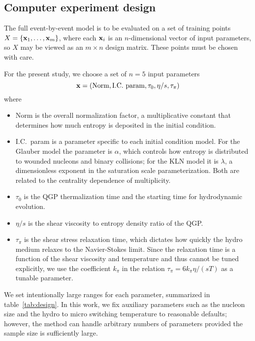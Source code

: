 \documentclass[aps,prc,reprint,superscriptaddress,amsmath]{revtex4-1}
\begin{document}
\subsection{Computer experiment design}

The full event-by-event model is to be evaluated on a set of training points $X = \{\mathbf x_1, \ldots, \mathbf x_m\}$, where each $\mathbf x_i$ is an $n$-dimensional vector of input parameters, so $X$ may be viewed as an $m \times n$ design matrix.
These points must be chosen with care.

For the present study, we choose a set of $n = 5$ input parameters
\begin{equation}
  \mathbf x = (\text{Norm}, \text{I.C.\ param}, \tau_0, \eta/s, \tau_\pi)
\end{equation}
where
\begin{itemize}
  \item Norm is the overall normalization factor, a multiplicative constant that determines how much entropy is deposited in the initial condition.
  \item I.C.\ param is a parameter specific to each initial condition model.
    For the Glauber model the parameter is $\alpha$, which controls how entropy is distributed to wounded nucleons and binary collisions;
    for the KLN model it is $\lambda$, a dimensionless exponent in the saturation scale parameterization.
    Both are related to the centrality dependence of multiplicity.
  \item $\tau_0$ is the QGP thermalization time and the starting time for hydrodynamic evolution.
  \item $\eta/s$ is the shear viscosity to entropy density ratio of the QGP.
  \item $\tau_\pi$ is the shear stress relaxation time, which dictates how quickly the hydro medium relaxes to the Navier-Stokes limit.
    Since the relaxation time is a function of the shear viscosity and temperature and thus cannot be tuned explicitly, we use the coefficient $k_\pi$ in the relation $\tau_\pi = 6k_\pi\eta/(sT)$ as a tunable parameter.
\end{itemize}
We set intentionally large ranges for each parameter, summarized in table~\ref{tab:design}.
In this work, we fix auxiliary parameters such as the nucleon size and the hydro to micro switching temperature to reasonable defaults; however, the method can handle arbitrary numbers of parameters provided the sample size is sufficiently large.
\end{document}
